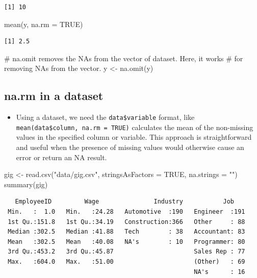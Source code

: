\documentclass[
  letterpaper,
  DIV=11,
  numbers=noendperiod]{scrreprt}
\newenvironment{Shaded}{\begin{snugshade}}{\end{snugshade}}
\newcommand{\AttributeTok}[1]{\textcolor[rgb]{0.40,0.45,0.13}{#1}}
\newcommand{\CommentTok}[1]{\textcolor[rgb]{0.37,0.37,0.37}{#1}}
\newcommand{\ConstantTok}[1]{\textcolor[rgb]{0.56,0.35,0.01}{#1}}
\newcommand{\FunctionTok}[1]{\textcolor[rgb]{0.28,0.35,0.67}{#1}}
\newcommand{\NormalTok}[1]{\textcolor[rgb]{0.00,0.23,0.31}{#1}}
\newcommand{\OtherTok}[1]{\textcolor[rgb]{0.00,0.23,0.31}{#1}}
\newcommand{\StringTok}[1]{\textcolor[rgb]{0.13,0.47,0.30}{#1}}
\providecommand{\tightlist}{%
  \setlength{\itemsep}{0pt}\setlength{\parskip}{0pt}}\usepackage{longtable,booktabs,array}
\begin{document}
\begin{verbatim}
[1] 10
\end{verbatim}

\begin{Shaded}
\begin{Highlighting}[]
\FunctionTok{mean}\NormalTok{(y, }\AttributeTok{na.rm =} \ConstantTok{TRUE}\NormalTok{)}
\end{Highlighting}
\end{Shaded}

\begin{verbatim}
[1] 2.5
\end{verbatim}

\begin{Shaded}
\begin{Highlighting}[]
\CommentTok{\# na.omit removes the NAs from the vector of dataset. Here, it works}
\CommentTok{\# for removing NAs from the vector.}
\NormalTok{y }\OtherTok{\textless{}{-}} \FunctionTok{na.omit}\NormalTok{(y)}
\end{Highlighting}
\end{Shaded}

\subsection{na.rm in a dataset}\label{na.rm-in-a-dataset}

\begin{itemize}
\tightlist
\item
  Using a dataset, we need the \texttt{data\$variable} format, like
  \texttt{mean(data\$column,\ na.rm\ =\ TRUE)} calculates the mean of
  the non-missing values in the specified column or variable. This
  approach is straightforward and useful when the presence of missing
  values would otherwise cause an error or return an NA result.
\end{itemize}

\begin{Shaded}
\begin{Highlighting}[]
\NormalTok{gig }\OtherTok{\textless{}{-}} \FunctionTok{read.csv}\NormalTok{(}\StringTok{"data/gig.csv"}\NormalTok{, }\AttributeTok{stringsAsFactors =} \ConstantTok{TRUE}\NormalTok{, }\AttributeTok{na.strings =} \StringTok{""}\NormalTok{)}
\FunctionTok{summary}\NormalTok{(gig)}
\end{Highlighting}
\end{Shaded}

\begin{verbatim}
   EmployeeID         Wage               Industry           Job     
 Min.   :  1.0   Min.   :24.28   Automotive  :190   Engineer  :191  
 1st Qu.:151.8   1st Qu.:34.19   Construction:366   Other     : 88  
 Median :302.5   Median :41.88   Tech        : 38   Accountant: 83  
 Mean   :302.5   Mean   :40.08   NA's        : 10   Programmer: 80  
 3rd Qu.:453.2   3rd Qu.:45.87                      Sales Rep : 77  
 Max.   :604.0   Max.   :51.00                      (Other)   : 69  
                                                    NA's      : 16  
\end{verbatim}
\end{document}
